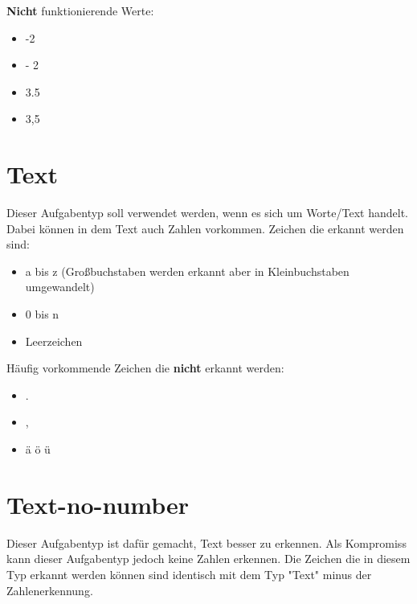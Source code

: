 \textbf{Nicht} funktionierende Werte:

\begin{itemize}
	\item -2
	\item - 2
	\item 3.5
	\item 3,5
\end{itemize}


\section{Text}

Dieser Aufgabentyp soll verwendet werden, wenn es sich um Worte/Text handelt.
Dabei k\"onnen in dem Text auch Zahlen vorkommen.
Zeichen die erkannt werden sind:

\begin{itemize}
	\item a bis z (Gro{\ss}buchstaben werden erkannt aber in Kleinbuchstaben umgewandelt)
	\item 0 bis n
	\item Leerzeichen
\end{itemize}

H\"aufig vorkommende Zeichen die \textbf{nicht} erkannt werden:

\begin{itemize}
	\item .
	\item ,
	\item \"a \"o \"u
\end{itemize}

\section{Text-no-number}

Dieser Aufgabentyp ist daf\"ur gemacht, Text besser zu erkennen.
Als Kompromiss kann dieser Aufgabentyp jedoch keine Zahlen erkennen.
Die Zeichen die in diesem Typ erkannt werden k\"onnen sind identisch mit dem Typ "Text" minus der Zahlenerkennung.
